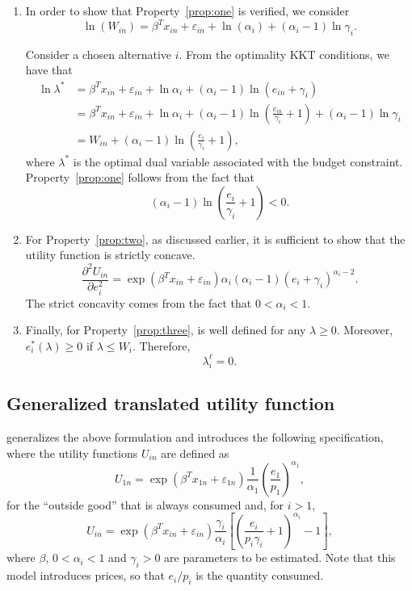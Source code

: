 \documentclass[12pt,a4paper]{article}
\begin{document}
\begin{enumerate}

\item In order to show that Property~\ref{prop:one} is verified, we consider
\[
   \ln(W_{in})  =\beta^T x_{in} + \varepsilon_{in} +\ln(\alpha_i) + (\alpha_i-1) \ln \gamma_i.
\]

Consider a chosen alternative $i$. From the optimality KKT conditions, we have that
\begin{align*}
   \ln \lambda^* &= \beta^T x_{in}+ \varepsilon_{in} + \ln \alpha_i + (\alpha_i-1) \ln (e_{in} + \gamma_i) \\
    &= \beta^T x_{in}+ \varepsilon_{in} + \ln \alpha_i + (\alpha_i-1) \ln (\frac{e_{in}}{\gamma_i}+1) +  (\alpha_i-1) \ln \gamma_i \\
    &= W_{in} +  (\alpha_i-1) \ln (\frac{e_i}{\gamma_i}+1),
\end{align*}
where $\lambda^*$ is the optimal dual variable associated with the budget constraint.
Property~\ref{prop:one} follows from the fact that
\[
   (\alpha_i-1) \ln (\frac{e_i}{\gamma_i}+1) < 0.
\]


\item For Property~\ref{prop:two}, as discussed earlier, it is sufficient to show that the utility function is strictly concave.
\[
    \frac{\partial^2 U_{in}}{\partial e_i^2} = \exp(\beta^T x_{in} + \varepsilon_{in})\alpha_i(\alpha_i-1)(e_i + \gamma_i)^{\alpha_i-2}.
\]
The strict concavity comes from the fact that $0 <\alpha_i < 1$.
\item Finally, for Property~\ref{prop:three},  is well defined for any $\lambda \geq 0$. Moreover,
    $e_i^*(\lambda) \geq 0$ if $\lambda \leq W_i$. Therefore,
\[
              \lambda^\ell_i = 0.
\]


\end{enumerate}
\subsection{Generalized translated utility function}

 generalizes the above formulation and introduces the following specification, where the utility functions $U_{in}$ are defined as
\begin{equation}
  \label{eq:generalized_utility_outside}
U_{1n} =\exp(\beta^T x_{1n} + \varepsilon_{1n}) \frac{1}{\alpha_1} \left(\frac{e_1}{p_1}\right)^{\alpha_1},
\end{equation}
for the ``outside good'' that is always consumed and, for $i > 1$,
\begin{equation}
  \label{eq:generalized_utility}
U_{in} =\exp(\beta^T x_{in} + \varepsilon_{in}) \frac{\gamma_i}{\alpha_i} \left[\left(\frac{e_i}{p_i \gamma_i}+1\right)^{\alpha_i}-1\right],
\end{equation}
where $\beta$, $0 < \alpha_i < 1$ and $\gamma_i > 0$ are parameters to be
estimated. Note that this model introduces prices, so that $e_i/p_i$ is the quantity consumed.
\end{document}
